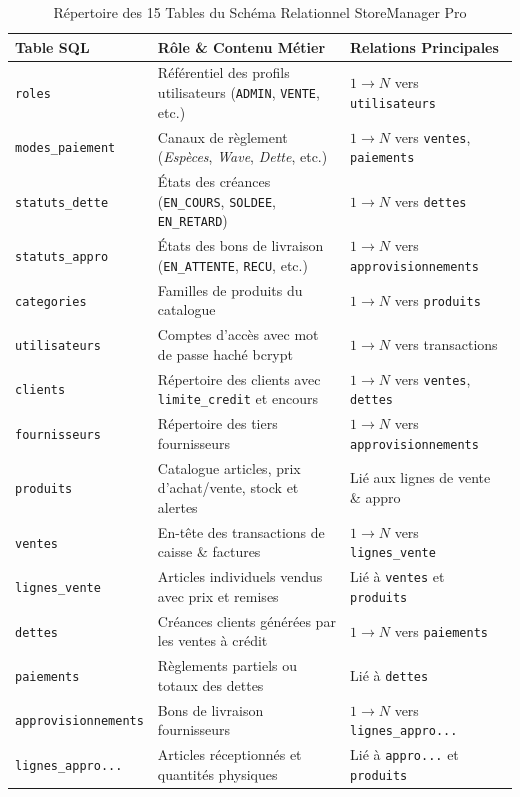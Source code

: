 \documentclass[11pt,a4paper,titlepage,twoside,openright]{report}
\begin{document}
\begin{table}[htbp]
\centering
\small
\begin{tabularx}{\textwidth}{lXl}
\toprule
\textbf{Table SQL} & \textbf{Rôle \& Contenu Métier} & \textbf{Relations Principales} \\
\midrule
\texttt{roles} & Référentiel des profils utilisateurs (\texttt{ADMIN}, \texttt{VENTE}, etc.) & $1 \to N$ vers \texttt{utilisateurs} \\
\texttt{modes\_paiement} & Canaux de règlement (\emph{Espèces}, \emph{Wave}, \emph{Dette}, etc.) & $1 \to N$ vers \texttt{ventes}, \texttt{paiements} \\
\texttt{statuts\_dette} & États des créances (\texttt{EN\_COURS}, \texttt{SOLDEE}, \texttt{EN\_RETARD}) & $1 \to N$ vers \texttt{dettes} \\
\texttt{statuts\_appro} & États des bons de livraison (\texttt{EN\_ATTENTE}, \texttt{RECU}, etc.) & $1 \to N$ vers \texttt{approvisionnements} \\
\texttt{categories} & Familles de produits du catalogue & $1 \to N$ vers \texttt{produits} \\
\texttt{utilisateurs} & Comptes d'accès avec mot de passe haché bcrypt & $1 \to N$ vers transactions \\
\texttt{clients} & Répertoire des clients avec \texttt{limite\_credit} et encours & $1 \to N$ vers \texttt{ventes}, \texttt{dettes} \\
\texttt{fournisseurs} & Répertoire des tiers fournisseurs & $1 \to N$ vers \texttt{approvisionnements} \\
\texttt{produits} & Catalogue articles, prix d'achat/vente, stock et alertes & Lié aux lignes de vente \& appro \\
\texttt{ventes} & En-tête des transactions de caisse \& factures & $1 \to N$ vers \texttt{lignes\_vente} \\
\texttt{lignes\_vente} & Articles individuels vendus avec prix et remises & Lié à \texttt{ventes} et \texttt{produits} \\
\texttt{dettes} & Créances clients générées par les ventes à crédit & $1 \to N$ vers \texttt{paiements} \\
\texttt{paiements} & Règlements partiels ou totaux des dettes & Lié à \texttt{dettes} \\
\texttt{approvisionnements} & Bons de livraison fournisseurs & $1 \to N$ vers \texttt{lignes\_appro...} \\
\texttt{lignes\_appro...} & Articles réceptionnés et quantités physiques & Lié à \texttt{appro...} et \texttt{produits} \\
\bottomrule
\end{tabularx}
\caption{Répertoire des 15 Tables du Schéma Relationnel StoreManager Pro}
\label{tab:sql_schema}
\end{table}
\end{document}
